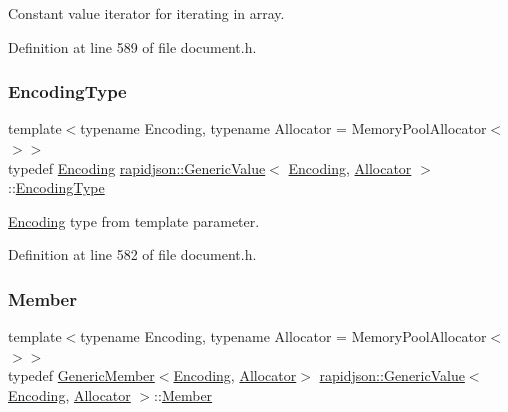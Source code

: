 Constant value iterator for iterating in array. 



Definition at line 589 of file document.\+h.

\mbox{\label{classrapidjson_1_1_generic_value_a05906384808645a2e798d29a9b2d441d}} 
\subsubsection{\texorpdfstring{EncodingType}{EncodingType}}
{\footnotesize\ttfamily template$<$typename Encoding, typename Allocator = Memory\+Pool\+Allocator$<$$>$$>$ \\
typedef \mbox{\hyperlink{classrapidjson_1_1_encoding}{Encoding}} \mbox{\hyperlink{classrapidjson_1_1_generic_value}{rapidjson\+::\+Generic\+Value}}$<$ \mbox{\hyperlink{classrapidjson_1_1_encoding}{Encoding}}, \mbox{\hyperlink{classrapidjson_1_1_allocator}{Allocator}} $>$\+::\mbox{\hyperlink{classrapidjson_1_1_generic_value_a05906384808645a2e798d29a9b2d441d}{Encoding\+Type}}}



\mbox{\hyperlink{classrapidjson_1_1_encoding}{Encoding}} type from template parameter. 



Definition at line 582 of file document.\+h.

\mbox{\label{classrapidjson_1_1_generic_value_a0220ddebe2f023fa75b643a50e90e559}} 
\subsubsection{\texorpdfstring{Member}{Member}}
{\footnotesize\ttfamily template$<$typename Encoding, typename Allocator = Memory\+Pool\+Allocator$<$$>$$>$ \\
typedef \mbox{\hyperlink{structrapidjson_1_1_generic_member}{Generic\+Member}}$<$\mbox{\hyperlink{classrapidjson_1_1_encoding}{Encoding}}, \mbox{\hyperlink{classrapidjson_1_1_allocator}{Allocator}}$>$ \mbox{\hyperlink{classrapidjson_1_1_generic_value}{rapidjson\+::\+Generic\+Value}}$<$ \mbox{\hyperlink{classrapidjson_1_1_encoding}{Encoding}}, \mbox{\hyperlink{classrapidjson_1_1_allocator}{Allocator}} $>$\+::\mbox{\hyperlink{classrapidjson_1_1_generic_value_a0220ddebe2f023fa75b643a50e90e559}{Member}}}



